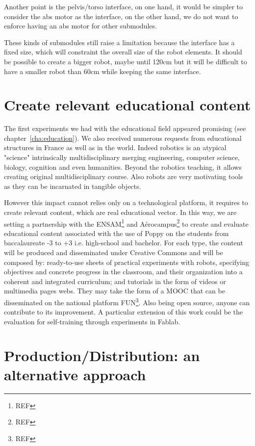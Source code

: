 Another point is the pelvis/torso interface, on one hand, it would be simpler to consider the abs motor as the interface, on the other hand, we do not want to enforce having an abs motor for other submodules.

These kinds of submodules still raise a limitation because the interface has a fixed size, which will constraint the overall size of the robot elements. It should be possible to create a bigger robot, maybe until 120cm but it will be difficult to have a smaller robot than 60cm while keeping the same interface.


\section{Create relevant educational content} %

The first experiments we had with the educational field appeared promising (see chapter~\ref{cha:education}). We also received numerous requests from educational structures in France as well as in the world. Indeed robotics is an atypical "science" intrinsically multidisciplinary merging engineering, computer science, biology, cognition and even humanities. Beyond the robotics teaching, it allows creating original multidisciplinary course. Also robots are very motivating tools as they can be incarnated in tangible objects.

However this impact cannot relies only on a technological platform, it requires to create relevant content, which are real educational vector.
In this way, we are setting a partnership with the ENSAM\footnote{REF} and Aérocampus\footnote{REF} to create and evaluate educational content associated with the use of Poppy on the students from baccalaureate -3 to +3 i.e. high-school and bachelor. For each type, the content will be produced and disseminated under Creative Commons and will be composed by: ready-to-use sheets of practical experiments with robots, specifying objectives and concrete progress in the classroom, and their organization into a coherent and integrated curriculum; and tutorials in the form of videos or multimedia pages webs. They may take the form of a MOOC that can be disseminated on the national platform FUN\footnote{REF}. Also being open source, anyone can contribute to its improvement. A particular extension of this work could be the evaluation for self-training through experiments in Fablab.




\section{Production/Distribution: an alternative approach} %

